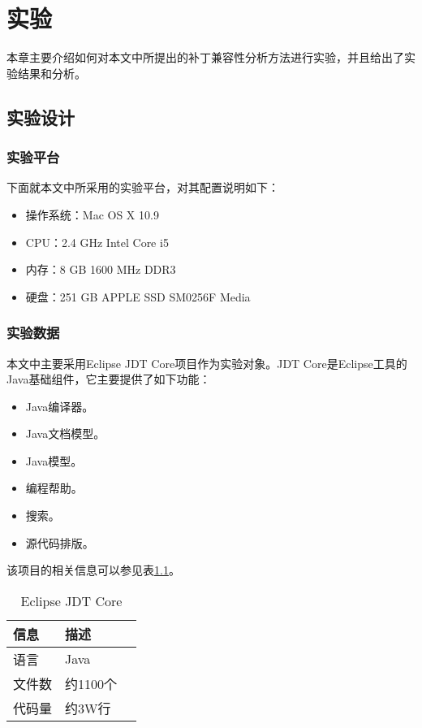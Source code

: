 \chapter{实验}
本章主要介绍如何对本文中所提出的补丁兼容性分析方法进行实验，并且给出了实验结果和分析。
\section{实验设计}
\subsection{实验平台}
下面就本文中所采用的实验平台，对其配置说明如下：
\begin{itemize}
	\item 操作系统：Mac OS X 10.9
	\item CPU：2.4 GHz Intel Core i5
	\item 内存：8 GB 1600 MHz DDR3
	\item 硬盘：251 GB APPLE SSD SM0256F Media
\end{itemize}
\subsection{实验数据}

本文中主要采用Eclipse JDT Core项目作为实验对象。JDT Core是Eclipse工具的Java基础组件，它主要提供了如下功能：
\begin{itemize}
	\item Java编译器。
	\item Java文档模型。
	\item Java模型。
	\item 编程帮助。
	\item 搜索。
	\item 源代码排版。
\end{itemize}

该项目的相关信息可以参见表\ref {jdt_core}。

\begin{table}
	\caption{Eclipse JDT Core}
	\label{jdt_core}
	\centering
	\begin{tabular}{llc}
		\toprule[1.5pt]
		{\heiti 信息} & {\heiti 描述} \\\midrule[1pt]
		语言 & Java \\
		文件数 & 约1100个\\
		代码量 & 约3W行\\
		\bottomrule[1.5pt]
	\end{tabular}
\end{table}

